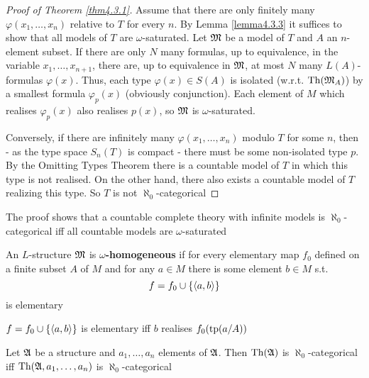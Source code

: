 \documentclass[11pt]{article}
\begin{document}
\begin{proof}[Proof of Theorem \ref{thm4.3.1}]
Assume that there are only finitely many \(\varphi(x_1,\dots,x_n)\) relative to
\(T\) for every \(n\). By Lemma \ref{lemma4.3.3} it suffices to show that all
models of \(T\) are \(\omega\)-saturated. Let \(\mathfrak{M}\) be a model of \(T\) and
\(A\) an \(n\)-element subset. If there are only \(N\) many formulas, up to
equivalence, in the variable \(x_1,\dots,x_{n+1}\), there are, up to
equivalence in \(\mathfrak{M}\), at most \(N\) many \(L(A)\)-formulas \(\varphi(x)\). Thus,
each type \(\varphi(x)\in S(A)\) is isolated (w.r.t. \(\operatorname{Th}(\mathfrak{M}_A)\)) by a smallest formula \(\varphi_p(x)\)
(obviously conjunction). Each element of \(M\) which realises
\(\varphi_p(x)\) also realises \(p(x)\), so \(\mathfrak{M}\) is \(\omega\)-saturated.

Conversely, if there are infinitely many \(\varphi(x_1,\dots,x_n)\) modulo \(T\)
for some \(n\), then - as the type space \(S_n(T)\) is compact - there must
be some non-isolated type \(p\). By the Omitting Types Theorem there is a
countable model of \(T\) in which this type is not realised. On the other
hand, there also exists a countable model of \(T\) realizing this type. So
\(T\) is not \(\aleph_0\)-categorical
\end{proof}

The proof shows that a countable complete theory with infinite models is
\(\aleph_0\)-categorical iff all countable models are \(\omega\)-saturated

\begin{definition}[]
An \(L\)-structure \(\mathfrak{M}\) is \textbf{\(\omega\)-homogeneous} if for every elementary
map \(f_0\) defined on a finite subset \(A\) of \(M\)  and for any \(a\in M\)
there is some element \(b\in M\) s.t.
\begin{equation*}
f=f_0\cup\{\langle a,b\rangle\}
\end{equation*}
is elementary
\end{definition}

\(f=f_0\cup\{\langle a,b\rangle\}\) is elementary iff \(b\) realises
\(f_0(\operatorname{tp}(a/A))\)

\begin{corollary}[]
Let \(\mathfrak{A}\) be a structure and \(a_1,\dots,a_n\) elements of \(\mathfrak{A}\). Then
\(\operatorname{Th}(\mathfrak{A})\) is \(\aleph_0\)-categorical iff \(\operatorname{Th}(\mathfrak{A},a_1,\dots,a_n)\) is \(\aleph_0\)-categorical
\end{corollary}
\end{document}
